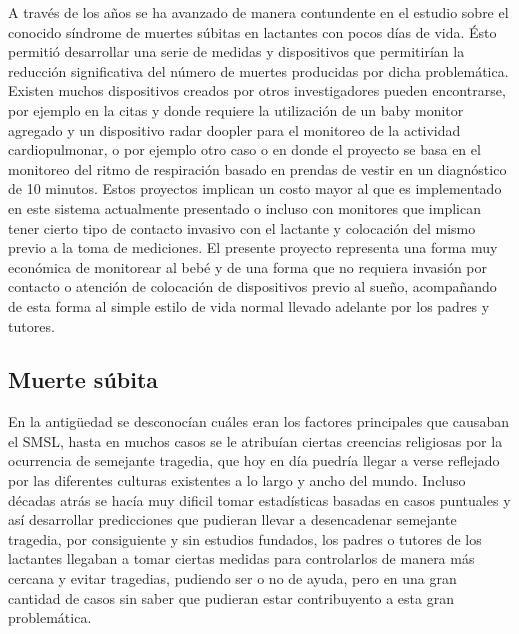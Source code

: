 \documentclass{IEEEtran}
\begin{document}
		A través de los años se ha avanzado de manera contundente en el estudio sobre el conocido síndrome de muertes súbitas en lactantes con pocos días de vida. Ésto permitió desarrollar una serie de medidas y dispositivos que permitirían la reducción significativa del número de muertes producidas por dicha problemática. Existen muchos dispositivos creados por otros investigadores pueden encontrarse, por ejemplo en la citas \cite{teodorescu2000respiration}  y \cite{hafner2007non} donde requiere la utilización de un baby monitor agregado y un dispositivo radar doopler para el monitoreo de la actividad cardiopulmonar, o por ejemplo otro caso \cite{brady2005garment} o \cite{lee2012baby} en donde el proyecto se basa en el monitoreo del ritmo de respiración basado en prendas de vestir en un diagnóstico de 10 minutos. Estos proyectos implican un costo mayor al que es implementado en este sistema actualmente presentado o incluso con monitores que implican tener cierto tipo de contacto invasivo con el lactante y colocación del mismo previo a la toma de mediciones. El presente proyecto representa una forma muy económica de monitorear al bebé y de una forma que no requiera invasión por contacto o atención de colocación de dispositivos previo al sueño, acompañando de esta forma al simple estilo de vida normal llevado adelante por los padres y tutores.

		\subsection{Muerte súbita}

			En la antigüedad se desconocían cuáles eran los factores principales que causaban el SMSL, hasta en muchos casos se le atribuían ciertas creencias religiosas por la ocurrencia de semejante tragedia, que hoy en día puedría llegar a verse reflejado por las diferentes culturas existentes a lo largo y ancho del mundo. Incluso décadas atrás se hacía muy dificil tomar estadísticas basadas en casos puntuales y así desarrollar predicciones que pudieran llevar a desencadenar semejante tragedia, por consiguiente y sin estudios fundados, los padres o tutores de los lactantes llegaban a tomar ciertas medidas para controlarlos de manera más cercana y evitar tragedias, pudiendo ser o no de ayuda, pero en una gran cantidad de casos sin saber que pudieran estar contribuyento a esta gran problemática.
\end{document}
